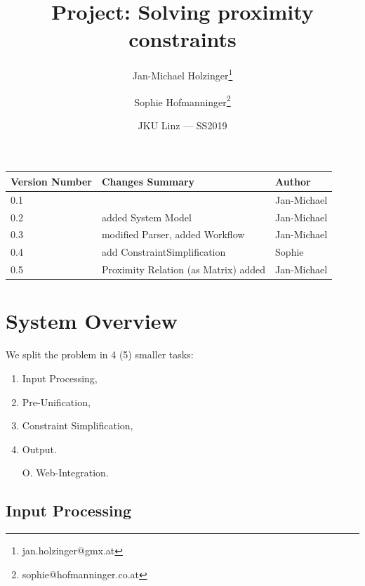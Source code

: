 \documentclass{article}
\title{Project: Solving proximity constraints} %
\author{Jan-Michael Holzinger\thanks{jan.holzinger@gmx.at} \and Sophie Hofmanninger\thanks{sophie@hofmanninger.co.at}} %
\date{JKU Linz --- SS2019} %
\begin{document}
\maketitle %


\begin{center}
\begin{tabular}[h]{|l|l|l|}
\hline
Version Number & Changes Summary & Author\\
\hline
0.1 & & Jan-Michael\\
\hline
0.2 & added System Model & Jan-Michael\\
\hline
0.3 & modified Parser, added Workflow & Jan-Michael\\
\hline
0.4 & add ConstraintSimplification & Sophie\\
\hline
0.5 & Proximity Relation (as Matrix) added & Jan-Michael\\
\hline
\end{tabular}

\end{center}
\section{System Overview}

We split the problem in 4 (5) smaller tasks:
\begin{enumerate}
	\item Input Processing,
	\item Pre-Unification,
	\item Constraint Simplification,
	\item Output.
	\item [O.] Web-Integration.
\end{enumerate}







\subsection{Input Processing} 
\end{document}
